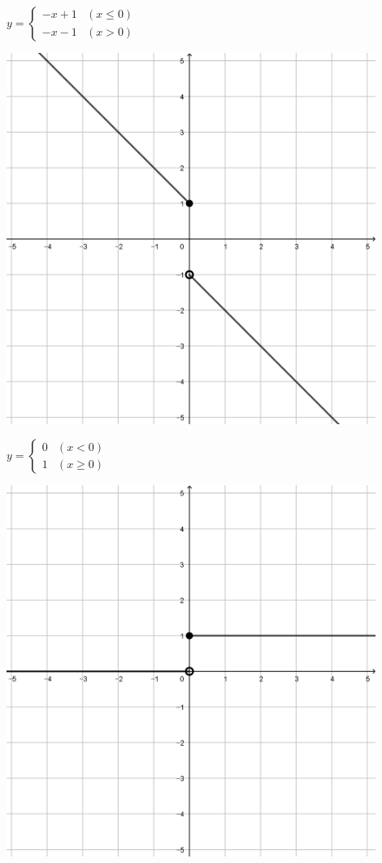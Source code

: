 \documentclass[a4paper]{oblivoir}
\begin{document}
\begin{minipage}{0.45\textwidth}\centering
\(y=\begin{cases}-x+1&(x\le0)\\-x-1&(x>0)\end{cases}\)
\par\bigskip\includegraphics[width=0.9\textwidth]{img/3_piecewise_7}
\end{minipage}
\begin{minipage}{0.45\textwidth}\centering
\(y=\begin{cases}0&(x<0)\\1&(x\ge0)\end{cases}\)
\par\bigskip\includegraphics[width=0.9\textwidth]{img/3_piecewise_8}
\end{minipage}\bigskip\bigskip\par
\end{document}
